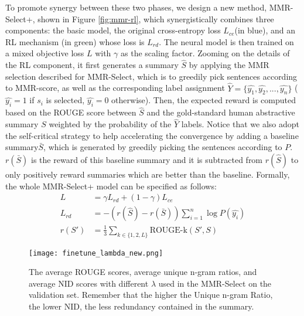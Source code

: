 \documentclass[11pt,a4paper]{article}
\begin{document}
To promote synergy between these two phases, we design a new method, MMR-Select+, shown in Figure \ref{fig:mmr-rl}, which synergistically combines three components: the basic model, the original cross-entropy loss $L_{ce}$(in blue), and an RL mechanism (in green) whose loss is $L_{rd}$. The neural model is then trained on a mixed objective loss $L$ with $\gamma$ as the scaling factor. Zooming on the details of the RL component, it first generates a summary $\hat{S}$ by applying the  MMR selection described for MMR-Select, which is to greedily pick sentences according to MMR-score, as well as the corresponding label assignment $\hat{Y}=\{\hat{y_1},\hat{y_2},...,\hat{y_n}\}$ ($\hat{y_i}=1$ if $s_i$ is selected, $\hat{y_i}=0$ otherwise). Then, the expected reward is computed based on the ROUGE score between $\hat{S}$ and the gold-standard human abstractive summary $S$ weighted by the probability of the $\hat{Y}$ labels. Notice that we also adopt the self-critical strategy \cite{rl-abstractive} to help accelerating the convergence by adding a baseline summary$\bar{S}$, which is generated by greedily picking the sentences according to $P$. $r(\bar{S})$ is the reward of this baseline summary and it is subtracted from $r(\hat{S})$ to only positively reward summaries which are better than the baseline. Formally, the whole MMR-Select+ model can be specified as follows:
\vspace{-2mm}
\begin{align*}
    L &= \gamma L_{rd}+(1-\gamma) L_{ce} \\
    L_{rd}  
&= -(r(\hat{S})-r(\bar{S}))\sum_{i=1}^{n}\log P(\hat{y_i}) \\
     r(S') &=  \frac{1}{3}\sum_{k\in \{1,2,L\}}\text{ROUGE-k}(S',S)
\end{align*}
\vspace{-2mm}
\begin{figure*}
    \centering
    \texttt{[image: finetune\_lambda\_new.png]}
    \vspace{-1mm}
    \caption{The average ROUGE scores, average unique n-gram ratios, and average NID scores with different $\lambda$ used in the MMR-Select on the validation set. Remember that the higher the Unique n-gram Ratio, the lower NID, the less redundancy contained in the summary.}
    \label{fig:finetune}
\end{figure*}
\end{document}

